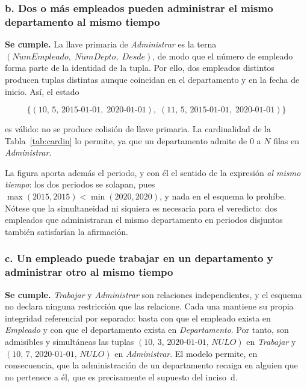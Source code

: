 \subsubsection*{b. Dos o más empleados pueden administrar el mismo departamento al mismo tiempo}

\textbf{Se cumple.} La llave primaria de \emph{Administrar} es la terna
$(\mathit{N\acute{u}mEmpleado},\; \mathit{N\acute{u}mDepto},\;
\mathit{Desde})$, de modo que el número de empleado forma parte de la
identidad de la tupla. Por ello, dos empleados distintos producen tuplas
distintas aunque coincidan en el departamento y en la fecha de inicio. Así, el
estado

\begin{equation}
  \bigl\{
    (10,\, 5,\, \mathit{2015\text{-}01\text{-}01},\; 2020\text{-}01\text{-}01),\;
    (11,\, 5,\, \mathit{2015\text{-}01\text{-}01},\; 2020\text{-}01\text{-}01)
  \bigr\}
\end{equation}

es válido: no se produce colisión de llave primaria. La cardinalidad de la
Tabla~\ref{tab:cardin} lo permite, ya que un departamento admite de $0$ a $N$
filas en \emph{Administrar}.

La figura aporta además el periodo, y con él el sentido de la expresión
\emph{al mismo tiempo}: los dos periodos se solapan, pues $\max(2015, 2015) <
\min(2020, 2020)$, y nada en el esquema lo prohíbe. Nótese que la
simultaneidad ni siquiera es necesaria para el veredicto: dos empleados que
administraran el mismo departamento en periodos disjuntos también satisfarían
la afirmación.

\subsubsection*{c. Un empleado puede trabajar en un departamento y administrar otro al mismo tiempo}

\textbf{Se cumple.} \emph{Trabajar} y \emph{Administrar} son relaciones
independientes, y el esquema no declara ninguna restricción que las relacione.
Cada una mantiene su propia integridad referencial por separado: basta con que
el empleado exista en \emph{Empleado} y con que el departamento exista en
\emph{Departamento}. Por tanto, son admisibles y simultáneas las tuplas
$(10,\, 3,\, 2020\text{-}01\text{-}01,\, \mathit{NULO})$ en \emph{Trabajar} y
$(10,\, 7,\, 2020\text{-}01\text{-}01,\, \mathit{NULO})$ en
\emph{Administrar}. El modelo permite, en consecuencia, que la administración
de un departamento recaiga en alguien que no pertenece a él, que es
precisamente el supuesto del inciso~d.

